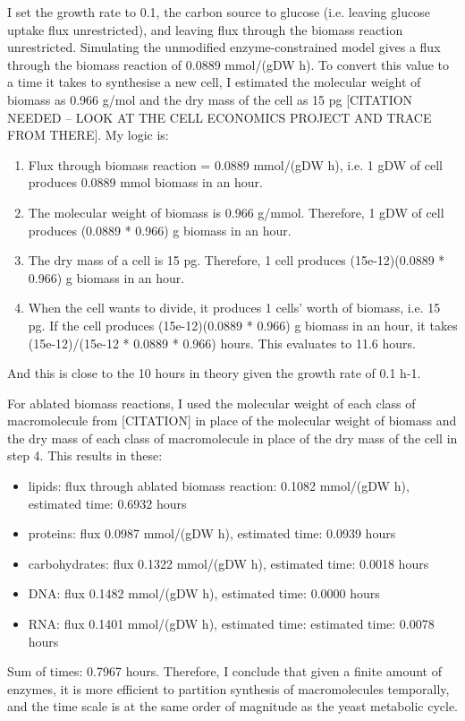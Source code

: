 I set the growth rate to 0.1, the carbon source to glucose (i.e. leaving glucose uptake flux unrestricted), and leaving flux through the biomass reaction unrestricted.
Simulating the unmodified enzyme-constrained model gives a flux through the biomass reaction of 0.0889 mmol/(gDW h).
To convert this value to a time it takes to synthesise a new cell, I estimated the molecular weight of biomass as 0.966 g/mol \parencite{takhaveevTemporalSegregationBiosynthetic2023} and the dry mass of the cell as 15 pg [CITATION NEEDED -- LOOK AT THE CELL ECONOMICS PROJECT AND TRACE FROM THERE].
My logic is:
\begin{enumerate}
   \item Flux through biomass reaction = 0.0889 mmol/(gDW h), i.e. 1 gDW of cell produces 0.0889 mmol biomass in an hour.
   \item The molecular weight of biomass is 0.966 g/mmol.  Therefore, 1 gDW of cell produces (0.0889 * 0.966) g biomass in an hour.
   \item The dry mass of a cell is 15 pg.  Therefore, 1 cell produces (15e-12)(0.0889 * 0.966) g biomass in an hour.
   \item When the cell wants to divide, it produces 1 cells' worth of biomass, i.e. 15 pg.  If the cell produces (15e-12)(0.0889 * 0.966) g biomass in an hour, it takes (15e-12)/(15e-12 * 0.0889 * 0.966) hours.  This evaluates to 11.6 hours.
\end{enumerate}
And this is close to the 10 hours in theory given the growth rate of 0.1 h-1.

For ablated biomass reactions, I used the molecular weight of each class of macromolecule from [CITATION] in place of the molecular weight of biomass and the dry mass of each class of macromolecule in place of the dry mass of the cell in step 4.
This results in these:
\begin{itemize}
  \item lipids: flux through ablated biomass reaction: 0.1082 mmol/(gDW h), estimated time: 0.6932 hours
  \item proteins: flux 0.0987 mmol/(gDW h), estimated time: 0.0939 hours
  \item carbohydrates: flux 0.1322 mmol/(gDW h), estimated time: 0.0018 hours
  \item DNA: flux 0.1482 mmol/(gDW h), estimated time: 0.0000 hours
  \item RNA: flux 0.1401 mmol/(gDW h), estimated time: estimated time: 0.0078 hours
\end{itemize}
Sum of times: 0.7967 hours.
Therefore, I conclude that given a finite amount of enzymes, it is more efficient to partition synthesis of macromolecules temporally, and the time scale is at the same order of magnitude as the yeast metabolic cycle.

